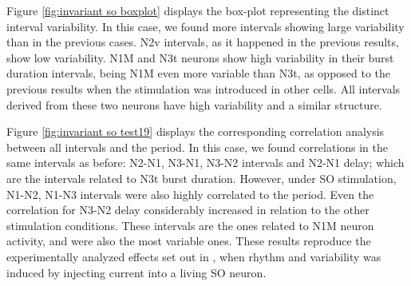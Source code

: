 Figure \ref{fig:invariant so boxplot} displays the box-plot representing the distinct interval variability. In this case, we found more intervals showing large variability than in the previous cases. N2v intervals, as it happened in the previous results, show low variability. %
N1M and N3t neurons show high variability in their burst duration intervals, being N1M even more variable than N3t, as opposed to the previous results when the stimulation was introduced in other cells. All intervals derived from these two neurons have high variability and a similar structure. %




Figure \ref{fig:invariant so test19} displays the corresponding correlation analysis between all intervals and the period. %
In this case, we found correlations in the same intervals as before: N2-N1, N3-N1, N3-N2 intervals and N2-N1 delay; which are the intervals related to N3t burst duration. However, under SO stimulation,  N1-N2, N1-N3 intervals were also highly correlated to the period. Even the correlation for N3-N2 delay considerably increased in relation to the other stimulation conditions. These intervals are the ones related to N1M neuron activity, and were also the most variable ones.  These results reproduce the experimentally analyzed effects set out in \parencite{elliott_temporal_1991}, when rhythm and variability was induced by injecting current into a living SO neuron.

